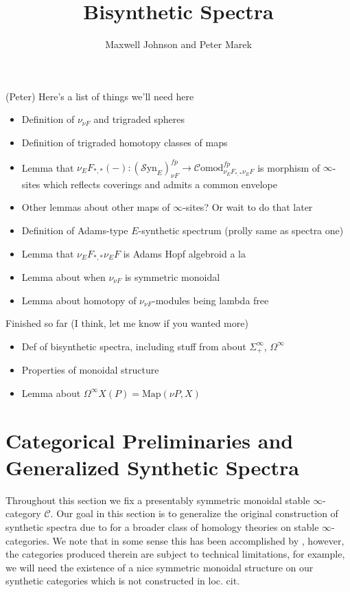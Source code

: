 \documentclass[10pt]{amsart}
\theoremstyle{definition}
\numberwithin{figure}{section}
\numberwithin{equation}{section}
\newcommand{\cC}{\mathcal{C}}
\theoremstyle{cited}
\newcommand{\Map}{\mathrm{Map}}
\newcommand{\Syn}{\mathcal{S}\mathrm{yn}}
\newcommand{\Comod}{\mathcal{C}\mathrm{omod}}
\begin{document}
\title{Bisynthetic Spectra}
\author{Maxwell Johnson and Peter Marek}

\maketitle

(Peter) Here's a list of things we'll need here
\begin{itemize}
    \item Definition of $\nu_{\nu F}$ and trigraded spheres
    \item Definition of trigraded homotopy classes of maps 
    \item Lemma that $\nu_EF_{*,*}(-):(\Syn_E)_{\nu F}^{fp}\to\Comod_{\nu_EF_{*,*}\nu_EF}^{fp}$ is morphism of $\infty$-sites which reflects coverings and admits a common envelope
    \item Other lemmas about other maps of $\infty$-sites? Or wait to do that later
    \item Definition of Adams-type $E$-synthetic spectrum (prolly same as spectra one)
    \item Lemma that $\nu_EF_{*,*}\nu_EF$ is Adams Hopf algebroid a la \cite[Def. 3.1]{Pst22}
    \item Lemma about when $\nu_{\nu F}$ is symmetric monoidal
    \item Lemma about homotopy of $\nu_{\nu F}$-modules being lambda free
\end{itemize}
Finished so far (I think, let me know if you wanted more)

\begin{itemize}
  \item Def of bisynthetic spectra, including stuff from \cite{Pst22} about $\Sigma_+^\infty$, $\Omega^\infty$
  \item Properties of monoidal structure
  \item Lemma about $\Omega^\infty X(P)=\Map(\nu P, X)$
\end{itemize}

\section{Categorical Preliminaries and Generalized Synthetic Spectra}

Throughout this section we fix a presentably symmetric monoidal stable $\infty$-category $\cC$. Our goal in this section is to generalize the original construction of synthetic spectra due to \cite{Pst22} for a broader class of homology theories on stable $\infty$-categories. We note that in some sense this has been accomplished by \cite{todo}, however, the categories produced therein are subject to technical limitations, for example, we will need the existence of a nice symmetric monoidal structure on our synthetic categories which is not constructed in loc. cit.
\end{document}
